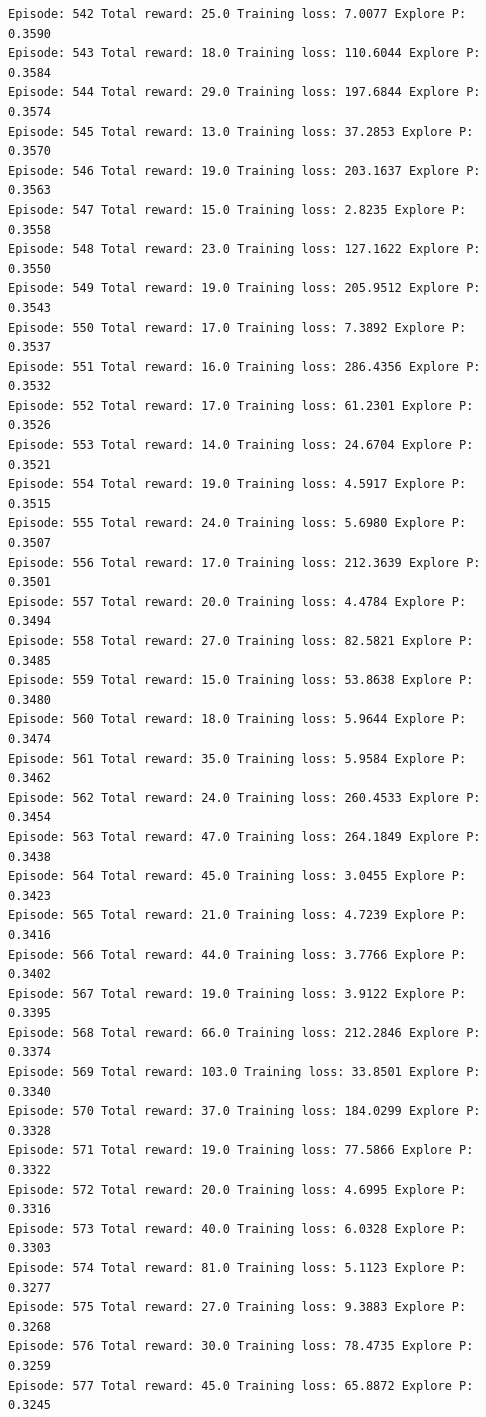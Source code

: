 \documentclass[11pt]{article}
\begin{document}
\begin{Verbatim}[commandchars=\\\{\}]
Episode: 542 Total reward: 25.0 Training loss: 7.0077 Explore P: 0.3590
Episode: 543 Total reward: 18.0 Training loss: 110.6044 Explore P: 0.3584
Episode: 544 Total reward: 29.0 Training loss: 197.6844 Explore P: 0.3574
Episode: 545 Total reward: 13.0 Training loss: 37.2853 Explore P: 0.3570
Episode: 546 Total reward: 19.0 Training loss: 203.1637 Explore P: 0.3563
Episode: 547 Total reward: 15.0 Training loss: 2.8235 Explore P: 0.3558
Episode: 548 Total reward: 23.0 Training loss: 127.1622 Explore P: 0.3550
Episode: 549 Total reward: 19.0 Training loss: 205.9512 Explore P: 0.3543
Episode: 550 Total reward: 17.0 Training loss: 7.3892 Explore P: 0.3537
Episode: 551 Total reward: 16.0 Training loss: 286.4356 Explore P: 0.3532
Episode: 552 Total reward: 17.0 Training loss: 61.2301 Explore P: 0.3526
Episode: 553 Total reward: 14.0 Training loss: 24.6704 Explore P: 0.3521
Episode: 554 Total reward: 19.0 Training loss: 4.5917 Explore P: 0.3515
Episode: 555 Total reward: 24.0 Training loss: 5.6980 Explore P: 0.3507
Episode: 556 Total reward: 17.0 Training loss: 212.3639 Explore P: 0.3501
Episode: 557 Total reward: 20.0 Training loss: 4.4784 Explore P: 0.3494
Episode: 558 Total reward: 27.0 Training loss: 82.5821 Explore P: 0.3485
Episode: 559 Total reward: 15.0 Training loss: 53.8638 Explore P: 0.3480
Episode: 560 Total reward: 18.0 Training loss: 5.9644 Explore P: 0.3474
Episode: 561 Total reward: 35.0 Training loss: 5.9584 Explore P: 0.3462
Episode: 562 Total reward: 24.0 Training loss: 260.4533 Explore P: 0.3454
Episode: 563 Total reward: 47.0 Training loss: 264.1849 Explore P: 0.3438
Episode: 564 Total reward: 45.0 Training loss: 3.0455 Explore P: 0.3423
Episode: 565 Total reward: 21.0 Training loss: 4.7239 Explore P: 0.3416
Episode: 566 Total reward: 44.0 Training loss: 3.7766 Explore P: 0.3402
Episode: 567 Total reward: 19.0 Training loss: 3.9122 Explore P: 0.3395
Episode: 568 Total reward: 66.0 Training loss: 212.2846 Explore P: 0.3374
Episode: 569 Total reward: 103.0 Training loss: 33.8501 Explore P: 0.3340
Episode: 570 Total reward: 37.0 Training loss: 184.0299 Explore P: 0.3328
Episode: 571 Total reward: 19.0 Training loss: 77.5866 Explore P: 0.3322
Episode: 572 Total reward: 20.0 Training loss: 4.6995 Explore P: 0.3316
Episode: 573 Total reward: 40.0 Training loss: 6.0328 Explore P: 0.3303
Episode: 574 Total reward: 81.0 Training loss: 5.1123 Explore P: 0.3277
Episode: 575 Total reward: 27.0 Training loss: 9.3883 Explore P: 0.3268
Episode: 576 Total reward: 30.0 Training loss: 78.4735 Explore P: 0.3259
Episode: 577 Total reward: 45.0 Training loss: 65.8872 Explore P: 0.3245

\end{Verbatim}
\end{document}
